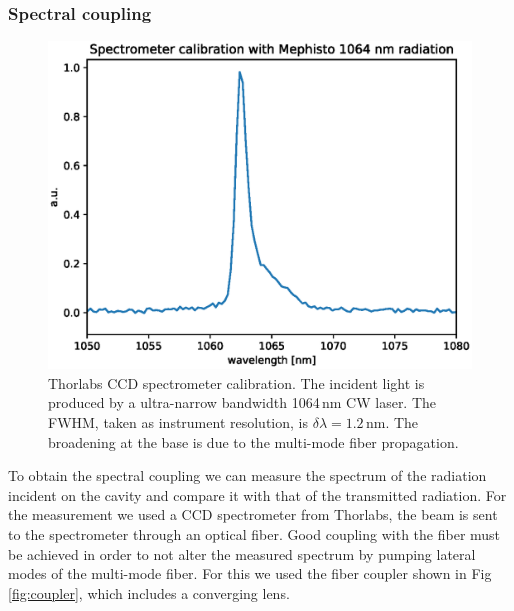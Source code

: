 \subsubsection{Spectral coupling}
\begin{figure}
	\centering
	\includegraphics[width=0.9\linewidth]{images/mephisto.eps}
	\caption{Thorlabs CCD spectrometer calibration. The incident light is produced by a ultra-narrow bandwidth 1064\,nm CW laser. The FWHM, taken as instrument resolution, is $\delta\lambda = 1.2$\,nm. The broadening at the base is due to the multi-mode fiber propagation.}
	\label{fig:mephisto}
\end{figure}

To obtain the spectral coupling we can measure the spectrum of the radiation incident on the cavity and compare it with that of the transmitted radiation. For the measurement we used a CCD spectrometer from Thorlabs, the beam is sent to the spectrometer through an optical fiber. Good coupling with the fiber must be achieved in order to not alter the measured spectrum by pumping lateral modes of the multi-mode fiber. For this we used the fiber coupler shown in Fig \ref{fig:coupler}, which includes a converging lens.

